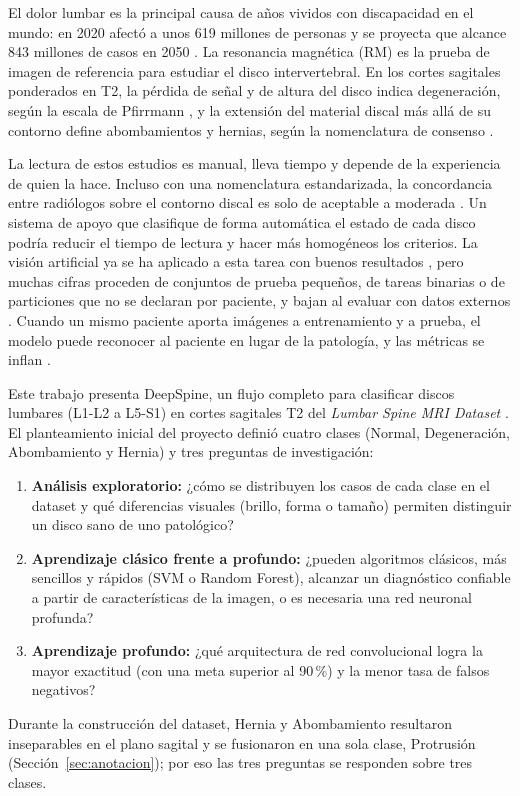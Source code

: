 El dolor lumbar es la principal causa de años vividos con discapacidad en el mundo: en 2020 afectó a unos 619 millones de personas y se proyecta que alcance 843 millones de casos en 2050 \cite{gbd2023}. La resonancia magnética (RM) es la prueba de imagen de referencia para estudiar el disco intervertebral. En los cortes sagitales ponderados en T2, la pérdida de señal y de altura del disco indica degeneración, según la escala de Pfirrmann \cite{pfirrmann2001}, y la extensión del material discal más allá de su contorno define abombamientos y hernias, según la nomenclatura de consenso \cite{fardon2014}.

La lectura de estos estudios es manual, lleva tiempo y depende de la experiencia de quien la hace. Incluso con una nomenclatura estandarizada, la concordancia entre radiólogos sobre el contorno discal es solo de aceptable a moderada \cite{arana2011}. Un sistema de apoyo que clasifique de forma automática el estado de cada disco podría reducir el tiempo de lectura y hacer más homogéneos los criterios. La visión artificial ya se ha aplicado a esta tarea con buenos resultados \cite{sari2025,tan2024,sayed2025scirep,wang2025}, pero muchas cifras proceden de conjuntos de prueba pequeños, de tareas binarias o de particiones que no se declaran por paciente, y bajan al evaluar con datos externos \cite{yi2023,nigru2024}. Cuando un mismo paciente aporta imágenes a entrenamiento y a prueba, el modelo puede reconocer al paciente en lugar de la patología, y las métricas se inflan \cite{brunekreef2024,rumala2023}.

Este trabajo presenta DeepSpine, un flujo completo para clasificar discos lumbares (L1-L2 a L5-S1) en cortes sagitales T2 del \emph{Lumbar Spine MRI Dataset} \cite{sudirman2019}. El planteamiento inicial del proyecto definió cuatro clases (Normal, Degeneración, Abombamiento y Hernia) y tres preguntas de investigación:
\begin{enumerate}
  \item[P1.] \textbf{Análisis exploratorio:} ¿cómo se distribuyen los casos de cada clase en el dataset y qué diferencias visuales (brillo, forma o tamaño) permiten distinguir un disco sano de uno patológico?
  \item[P2.] \textbf{Aprendizaje clásico frente a profundo:} ¿pueden algoritmos clásicos, más sencillos y rápidos (SVM o Random Forest), alcanzar un diagnóstico confiable a partir de características de la imagen, o es necesaria una red neuronal profunda?
  \item[P3.] \textbf{Aprendizaje profundo:} ¿qué arquitectura de red convolucional logra la mayor exactitud (con una meta superior al 90\,\%) y la menor tasa de falsos negativos?
\end{enumerate}
Durante la construcción del dataset, Hernia y Abombamiento resultaron inseparables en el plano sagital y se fusionaron en una sola clase, Protrusión (Sección~\ref{sec:anotacion}); por eso las tres preguntas se responden sobre tres clases.

